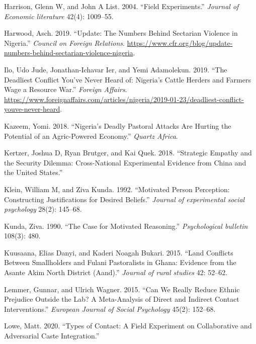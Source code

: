 \documentclass[11pt]{article}
\begin{document}
\begin{cslreferences}
\leavevmode\hypertarget{ref-harrison2004field}{}%
Harrison, Glenn W, and John A List. 2004. ``Field Experiments.''
\emph{Journal of Economic literature} 42(4): 1009--55.

\leavevmode\hypertarget{ref-council2019nigeria}{}%
Harwood, Asch. 2019. ``Update: The Numbers Behind Sectarian Violence in
Nigeria.'' \emph{Council on Foreign Relations}.
\url{https://www.cfr.org/blog/update-numbers-behind-sectarian-violence-nigeria}.

\leavevmode\hypertarget{ref-fa2019deadly}{}%
Ilo, Udo Jude, Jonathan-Ichavar Ier, and Yemi Adamolekun. 2019. ``The
Deadliest Conflict You've Never Heard of: Nigeria's Cattle Herders and
Farmers Wage a Resource War.'' \emph{Foreign Affairs}.
\url{https://www.foreignaffairs.com/articles/nigeria/2019-01-23/deadliest-conflict-youve-never-heard}.

\leavevmode\hypertarget{ref-kazeem2018ag}{}%
Kazeem, Yomi. 2018. ``Nigeria's Deadly Pastoral Attacks Are Hurting the
Potential of an Agric-Powered Economy.'' \emph{Quartz Africa}.

\leavevmode\hypertarget{ref-kertzer2018empathy}{}%
Kertzer, Joshua D, Ryan Brutger, and Kai Quek. 2018. ``Strategic Empathy
and the Security Dilemma: Cross-National Experimental Evidence from
China and the United States.''

\leavevmode\hypertarget{ref-klein1992motivated}{}%
Klein, William M, and Ziva Kunda. 1992. ``Motivated Person Perception:
Constructing Justifications for Desired Beliefs.'' \emph{Journal of
experimental social psychology} 28(2): 145--68.

\leavevmode\hypertarget{ref-kunda1990motivatedReasoning}{}%
Kunda, Ziva. 1990. ``The Case for Motivated Reasoning.''
\emph{Psychological bulletin} 108(3): 480.

\leavevmode\hypertarget{ref-kuusaana2015land}{}%
Kuusaana, Elias Danyi, and Kaderi Noagah Bukari. 2015. ``Land Conflicts
Between Smallholders and Fulani Pastoralists in Ghana: Evidence from the
Asante Akim North District (Aand).'' \emph{Journal of rural studies} 42:
52--62.

\leavevmode\hypertarget{ref-lemmer2015can}{}%
Lemmer, Gunnar, and Ulrich Wagner. 2015. ``Can We Really Reduce Ethnic
Prejudice Outside the Lab? A Meta-Analysis of Direct and Indirect
Contact Interventions.'' \emph{European Journal of Social Psychology}
45(2): 152--68.

\leavevmode\hypertarget{ref-lowe2020types}{}%
Lowe, Matt. 2020. ``Types of Contact: A Field Experiment on
Collaborative and Adversarial Caste Integration.''


\end{cslreferences}
\end{document}
